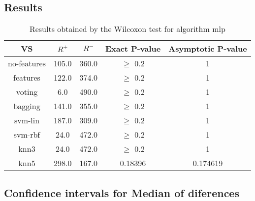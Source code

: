 \documentclass[a4paper,10pt]{article}
\begin{document}
\subsection{Results}

\begin{table}[!htp]
\centering\small
\begin{tabular}{
|c|c|c|c|c|}
\hline
 VS & $R^{+}$ & $R^{-}$ & Exact P-value & Asymptotic P-value \\ \hline 
no-features & 105.0 & 360.0 & $\geq$ 0.2 & 1\\ \hline 
features & 122.0 & 374.0 & $\geq$ 0.2 & 1\\ \hline 
voting & 6.0 & 490.0 & $\geq$ 0.2 & 1\\ \hline 
bagging & 141.0 & 355.0 & $\geq$ 0.2 & 1\\ \hline 
svm-lin & 187.0 & 309.0 & $\geq$ 0.2 & 1\\ \hline 
svm-rbf & 24.0 & 472.0 & $\geq$ 0.2 & 1\\ \hline 
knn3 & 24.0 & 472.0 & $\geq$ 0.2 & 1\\ \hline 
knn5 & 298.0 & 167.0 & 0.18396 & 0.174619\\ \hline 

\end{tabular}
\caption{Results obtained by the Wilcoxon test for algorithm mlp}
\end{table}

\subsection{Confidence intervals for Median of diferences}
\end{document}

